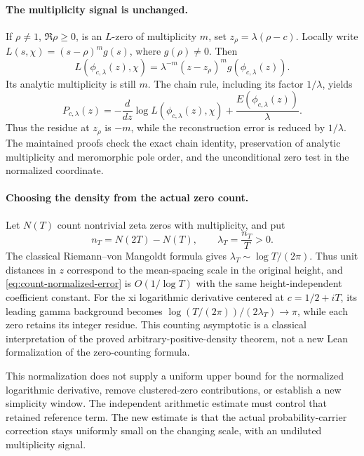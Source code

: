 \paragraph{The multiplicity signal is unchanged.}
If \(\rho\ne1\), \(\Re\rho\ge0\), is an \(L\)-zero of multiplicity \(m\), set
\(z_\rho=\lambda(\rho-c)\).  Locally write
\(L(s,\chi)=(s-\rho)^m g(s)\), where \(g(\rho)\ne0\).  Then
\[
 L(\phi_{c,\lambda}(z),\chi)
 =\lambda^{-m}(z-z_\rho)^m g(\phi_{c,\lambda}(z)).
\]
Its analytic multiplicity is still \(m\).  The chain rule, including
its factor \(1/\lambda\), yields
\[
 P_{c,\lambda}(z)
 =-\frac{d}{dz}\log L(\phi_{c,\lambda}(z),\chi)
   +\frac{E(\phi_{c,\lambda}(z))}{\lambda}.
\]
Thus the residue at \(z_\rho\) is \(-m\), while the reconstruction error
is reduced by \(1/\lambda\).  The maintained proofs check the exact
chain identity, preservation of analytic multiplicity and meromorphic
pole order, and the unconditional zero test in the normalized coordinate.

\paragraph{Choosing the density from the actual zero count.}
Let \(N(T)\) count nontrivial zeta zeros with multiplicity, and put
\[
 n_T=N(2T)-N(T),\qquad \lambda_T=\frac{n_T}{T}>0.
\]
The classical Riemann--von Mangoldt formula gives
\(\lambda_T\sim\log T/(2\pi)\).  Thus unit distances in \(z\) correspond
to the mean-spacing scale in the original height, and
\eqref{eq:count-normalized-error} is \(O(1/\log T)\) with the same
height-independent coefficient constant.  For the xi logarithmic
derivative centered at \(c=1/2+iT\), its leading gamma background becomes
\(\log(T/(2\pi))/(2\lambda_T)\to\pi\), while each zero retains its
integer residue.  This counting asymptotic is a classical interpretation
of the proved arbitrary-positive-density theorem, not a new Lean
formalization of the zero-counting formula.

This normalization does not supply a uniform upper bound for the
normalized logarithmic derivative, remove clustered-zero contributions,
or establish a new simplicity window.  The independent arithmetic
estimate must control that retained reference term.  The new estimate is
that the actual probability-carrier correction stays uniformly small
on the changing scale, with an undiluted multiplicity signal.

